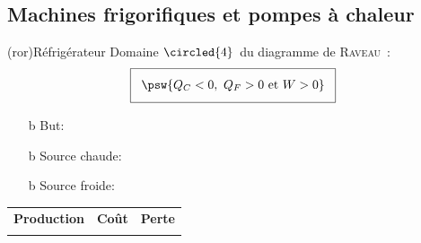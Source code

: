 \documentclass[../../main/main.tex]{subfiles}
\begin{document}
\subsection{Machines frigorifiques et pompes à chaleur}
\begin{tcb*}[sidebyside](ror){Réfrigérateur}
	Domaine $\circled{4}$ du diagramme de \textsc{Raveau}~:
	\begin{gather*}
		\setlength{\fboxsep}{3mm}
		\boxed{\psw{Q_C < 0,~Q_F > 0 \text{~et~} W > 0}}
	\end{gather*}
	\begin{itemize}
    \item[b]{But}: 
    \item[b]{\color{red}Source chaude}: 
    \item[b]{\color{blue}Source froide}: 
	\end{itemize}
  \begin{tabularx}{\linewidth}{YYY}
    \textbf{Production} &
    \textbf{Coût} &
    \textbf{Perte}
    \\
     &
     &
  \end{tabularx}
	\tcblower
	\begin{center}
\end{center}
\end{tcb*}
\end{document}
